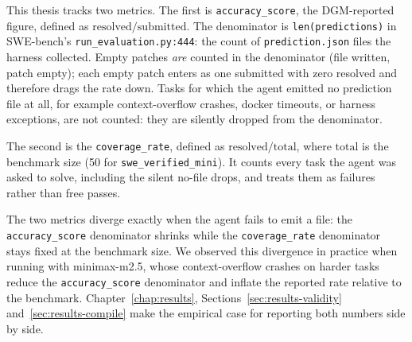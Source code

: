 This thesis tracks two metrics. The first is \texttt{accuracy\_score},
the DGM-reported figure, defined as
$\mathrm{resolved} / \mathrm{submitted}$. The denominator is
\texttt{len(predictions)} in SWE-bench's
\texttt{run\_evaluation.py:444}: the count of
\texttt{prediction.json} files the harness collected. Empty patches
\emph{are} counted in the denominator (file written, patch empty);
each empty patch enters as one submitted with zero resolved and
therefore drags the rate down. Tasks for which the agent emitted no
prediction file at all, for example context-overflow crashes, docker
timeouts, or harness exceptions, are not counted: they are silently
dropped from the denominator.

The second is the \texttt{coverage\_rate}, defined as
$\mathrm{resolved} / \mathrm{total}$, where $\mathrm{total}$ is the
benchmark size (50 for \texttt{swe\_verified\_mini}). It counts every
task the agent was asked to solve, including the silent no-file
drops, and treats them as failures rather than free passes.

The two metrics diverge exactly when the agent fails to emit a file:
the \texttt{accuracy\_score} denominator shrinks while the
\texttt{coverage\_rate} denominator stays fixed at the benchmark
size. We observed this divergence in practice when running with
minimax-m2.5, whose context-overflow crashes on harder tasks reduce
the \texttt{accuracy\_score} denominator and inflate the reported
rate relative to the benchmark. Chapter~\ref{chap:results},
Sections~\ref{sec:results-validity} and~\ref{sec:results-compile}
make the empirical case for reporting both numbers side by side.
